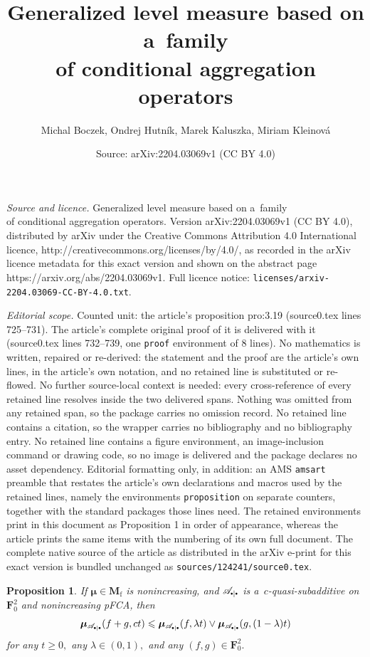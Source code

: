 \documentclass[10pt,a4paper]{amsart}
\title{Generalized level measure based on a~family \\of conditional aggregation operators}
\author{Michal Boczek, Ondrej Hutn\'ik, Marek Kaluszka, Miriam Kleinov\'a}
\date{Source: arXiv:2204.03069v1 (CC BY 4.0)}
\newtheorem{proposition}{Proposition}
\newcommand\bF{\mathbf{F}} %
\newcommand\bFs{\bF_0^2} %
\newcommand\bMf{\mathbf{M}_{\mathrm{f}}}%
\newcommand{\bmu}{\boldsymbol{\mu}}
\newcommand\bmub[1][\bpeA]{\bmu_{#1}}
\newcommand\bpeA{\mathscr {A}_{\sbullet|\sbullet}}%
\renewcommand\ge{\geqslant}
\renewcommand\le{\leqslant}
\newcommand\sbullet[1][.5]{\mathbin{\vcenter{\hbox{\scalebox{#1}{$\bullet$}}}}}
\begin{document}
\maketitle

\noindent\emph{Source and licence.} Generalized level measure based on a~family \\of conditional aggregation operators. Version arXiv:2204.03069v1 (CC BY 4.0), distributed by arXiv under the Creative Commons Attribution 4.0 International licence, http://creativecommons.org/licenses/by/4.0/, as recorded in the arXiv licence metadata for this exact version and shown on the abstract page https://arxiv.org/abs/2204.03069v1. Full licence notice: \texttt{licenses/arxiv-2204.03069-CC-BY-4.0.txt}.\par\smallskip

\noindent\textit{Editorial scope.} Counted unit: the article's proposition pro:3.19 (source0.tex lines 725--731). The article's complete original proof of it is delivered with it (source0.tex lines 732--739, one \texttt{proof} environment of 8 lines). No mathematics is written, repaired or re-derived: the statement and the proof are the article's own lines, in the article's own notation, and no retained line is substituted or re-flowed.  No further source-local context is needed: every cross-reference of every retained line resolves inside the two delivered spans.  Nothing was omitted from any retained span, so the package carries no omission record.  No retained line contains a citation, so the wrapper carries no bibliography and no bibliography entry.  No retained line contains a figure environment, an image-inclusion command or drawing code, so no image is delivered and the package declares no asset dependency.  Editorial formatting only, in addition: an AMS \texttt{amsart} preamble that restates the article's own declarations and macros used by the retained lines, namely the environments \texttt{proposition} on separate counters, together with the standard packages those lines need.  The retained environments print in this document as Proposition 1 in order of appearance, whereas the article prints the same items with the numbering of its own full document.  The complete native source of the article as distributed in the arXiv e-print for this exact version is bundled unchanged as \texttt{sources/124241/source0.tex}.
\begin{proposition}\label{pro:3.19}
If $\bmu\in\bMf$ is nonincreasing, and  $\bpeA$ is a~$c$-quasi-subadditive on $\bF_0^2$ and nonincreasing pFCA, then
\begin{align}\label{eq:3.19}
\bmub(f+g,ct)\le \bmub(f,\lambda t)\vee \bmub(g,(1-\lambda)t)
\end{align}
for any $t\ge 0,$  any $\lambda\in (0,1),$  and  any $(f,g)\in\bFs.$
\end{proposition}
\end{document}
